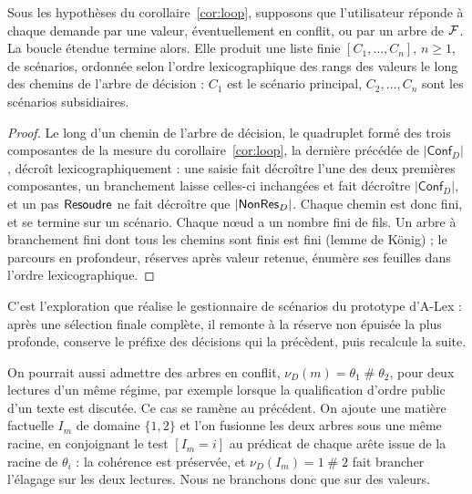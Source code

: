 \documentclass[review]{jflart}
\newcommand{\ALex}{A-Lex}
\newcommand{\conflit}{\mathbin{\#}}
\newcommand{\Conf}{\ensuremath{\mathsf{Conf}_D}}
\begin{document}
\begin{prop}[Scénarios]\label{prop:scenarios}
Sous les hypothèses du corollaire~\ref{cor:loop}, supposons que l'utilisateur
réponde à chaque demande par une valeur, éventuellement en conflit, ou par un
arbre de \(\mathcal{F}\). La boucle étendue termine alors. Elle produit une liste
finie \([C_1,\ldots,C_n]\), \(n\geq1\), de scénarios, ordonnée selon l'ordre
lexicographique des rangs des valeurs le long des chemins de l'arbre de
décision : \(C_1\) est le scénario principal, \(C_2,\ldots,C_n\) sont les
scénarios subsidiaires.
\end{prop}
\begin{proof}
Le long d'un chemin de l'arbre de décision, le quadruplet formé des trois
composantes de la mesure du corollaire~\ref{cor:loop}, la dernière précédée de
\(|\Conf|\), décroît lexicographiquement : une saisie fait décroître l'une des
deux premières composantes, un branchement laisse celles-ci inchangées et fait
décroître \(|\Conf|\), et un pas \(\mathsf{Resoudre}\) ne fait décroître que
\(|\mathsf{NonRes}_D|\). Chaque chemin est donc fini, et se termine sur un scénario.
Chaque nœud a un nombre fini de fils. Un arbre à branchement fini dont tous les
chemins sont finis est fini (lemme de König) ; le parcours en profondeur,
réserves après valeur retenue, énumère ses feuilles dans l'ordre
lexicographique.
\end{proof}

C'est l'exploration que réalise le gestionnaire de scénarios du prototype
d'\ALex{} : après une sélection finale complète, il remonte à la réserve non
épuisée la plus profonde, conserve le préfixe des décisions qui la précèdent,
puis recalcule la suite.

\begin{remark}
On pourrait aussi admettre des arbres en conflit,
\(\nu_D(m)=\theta_1\conflit\theta_2\), pour deux lectures d'un même régime,
par exemple lorsque la qualification d'ordre public d'un texte est discutée.
Ce cas se ramène au précédent. On ajoute une matière factuelle \(I_m\) de
domaine \(\{1,2\}\) et l'on fusionne les deux arbres sous une même racine, en
conjoignant le test \([I_m=i]\) au prédicat de chaque arête issue de la racine
de \(\theta_i\) : la cohérence est préservée, et
\(\nu_D(I_m)=1\conflit2\) fait brancher l'élagage sur les deux lectures. Nous
ne branchons donc que sur des valeurs.
\end{remark}
\end{document}
